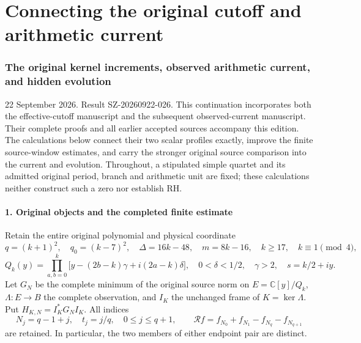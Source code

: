 \documentclass[10pt]{article}
\begin{document}
\clearpage\part{Connecting the original cutoff and arithmetic current}
\section{The original kernel increments, observed arithmetic current, and hidden evolution}\label{the-original-kernel-increments-observed-arithmetic-current-and-hidden-evolution}

22 September 2026. Result SZ-20260922-026. This continuation incorporates both the effective-cutoff manuscript and the subsequent observed-current manuscript. Their complete proofs and all earlier accepted sources accompany this edition. The calculations below connect their two scalar profiles exactly, improve the finite source-window estimates, and carry the stronger original source comparison into the current and evolution. Throughout, a stipulated simple quartet and its admitted original period, branch and arithmetic unit are fixed; these calculations neither construct such a zero nor establish RH.

\subsection{1. Original objects and the completed finite estimate}\label{original-objects-and-the-completed-finite-estimate}

Retain the entire original polynomial and physical coordinate \[
q=(k+1)^2,\quad q_0=(k-7)^2,\quad \Delta=16k-48,\quad m=8k-16,
\quad k\ge17,\quad k\equiv1\pmod4,
\] \[
Q_k(y)=\prod_{a,b=0}^{k}\bigl[y-(2b-k)\gamma+i(2a-k)\delta\bigr],
\quad 0<\delta<1/2,\quad\gamma>2,\quad s=k/2+iy.
\tag{RC1}
\] Let \(G_N\) be the complete minimum of the original source norm on \(E=\mathbb C[y]/Q_k\), \(\Lambda:E\to B\) the complete observation, and \(I_K\) the unchanged frame of \(K=\ker\Lambda\). Put \(H_{K,N}=I_K^*G_NI_K\). All indices \[
N_j=q-1+j,\quad t_j=j/q,\quad 0\le j\le q+1,
\qquad \mathcal R f=f_{N_0}+f_{N_1}-f_{N_q}-f_{N_{q+1}}
\tag{RC2}
\] are retained. In particular, the two members of either endpoint pair are distinct.
\end{document}
